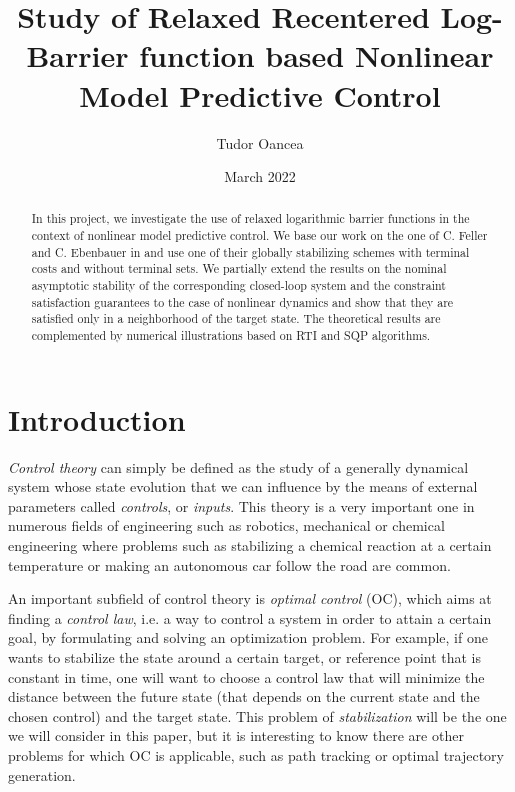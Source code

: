 \documentclass[12pt]{article}
\title{Study of Relaxed Recentered Log-Barrier function based Nonlinear Model Predictive Control}
\author{Tudor Oancea}
\date{March 2022}
\begin{document}
\maketitle

\begin{abstract}
	In this project, we investigate the use of relaxed logarithmic barrier functions in the context of nonlinear model predictive control.
	We base our work on the one of C. Feller and C. Ebenbauer in \cite{RRLB-linear-MPC} and use one of their globally stabilizing schemes with terminal costs and without terminal sets.
	We partially extend the results on the nominal asymptotic stability of the corresponding closed-loop system and the constraint satisfaction guarantees to the case of nonlinear dynamics and show that they are satisfied only in a neighborhood of the target state.
	The theoretical results are complemented by numerical illustrations based on RTI and SQP algorithms.
\end{abstract}

\section{Introduction}
\textit{Control theory} can simply be defined as the study of a generally dynamical system whose state evolution that we can influence by the means of external parameters called \textit{controls}, or \textit{inputs}.
This theory is a very important one in numerous fields of engineering such as robotics, mechanical or chemical engineering where problems such as stabilizing a chemical reaction at a certain temperature or making an autonomous car follow the road are common.

An important subfield of control theory is \textit{optimal control} (OC), which aims at finding a \textit{control law}, i.e. a way to control a system in order to attain a certain goal, by formulating and solving an optimization problem.
For example, if one wants to stabilize the state around a certain target, or reference point that is constant in time, one will want to choose a control law that will minimize the distance between the future state (that depends on the current state and the chosen control) and the target state.
This problem of \textit{stabilization} will be the one we will consider in this paper, but it is interesting to know there are other problems for which OC is applicable, such as path tracking or optimal trajectory generation. 
\end{document}
